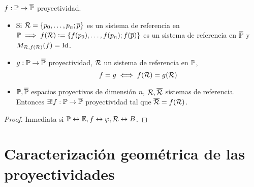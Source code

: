 \begin{prop}
    $f : \mathbb{P} \to \overline{\mathbb{P}}$ proyectividad.
    \begin{itemize}
        \item Si $\mathcal{R} = \{p_0, \dots, p_n; \overline{p}\}$ es un sistema de referencia en $\mathbb{P} \implies f(\mathcal{R}) := \{f(p_0), \dots, f(p_n); f(\overline{p})\}$ es un sistema de referencia en $\overline{\mathbb{P}}$ y $M_{\mathcal{R}, f(\mathcal{R})}(f) = \operatorname{Id}$.
        \item $g : \mathbb{P} \to \overline{\mathbb{P}}$ proyectividad, $\mathcal{R}$ un sistema de referencia en $\mathbb{P}$,
            \[
                f = g \iff f(\mathcal{R}) = g(\mathcal{R})
            \]
        \item $\mathbb{P}, \overline{\mathbb{P}}$ espacios proyectivos de dimensión $n$, $\mathcal{R}, \overline{\mathcal{R}}$ sistemas de referencia. Entonces $\exists! f : \mathbb{P} \to \overline{\mathbb{P}}$ proyectividad tal que $\overline{\mathcal{R}} = f(\mathcal{R})$.
    \end{itemize}
\end{prop}
\begin{proof}
    Inmediata si $\mathbb{P} \leftrightarrow \mathbb{E}, f \leftrightarrow \varphi, \mathcal{R} \leftrightarrow B$.
\end{proof}

\section{Caracterización geométrica de las proyectividades}


